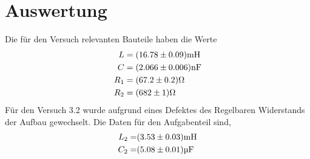 \section{Auswertung}
\label{sec:Auswertung}
Die für den Versuch relevanten Bauteile haben die Werte
\begin{eqnarray}
  L 	&= (\num{16.78 +- 0.09}) \text{mH}	\\
  C 	&= (\num{2.066 +- 0.006}) \text{nF}	\\
R_1 	&= (\num{67.2 +- 0.2}) \Omega	\\
R_2 	&= (\num{682 +- 1}) \Omega
  \label{eqn:Bau}
\end{eqnarray}
Für den Versuch 3.2 wurde aufgrund eines Defektes des Regelbaren Widerstands der Aufbau gewechselt. Die Daten für den Aufgabenteil sind,\begin{eqnarray}
  L_2 =& (\num{3.53 +- 0.03}) \text{mH}	\\
  C_2 =& (\num{5.08 +- 0.01}) \text{µF}
\end{eqnarray}
